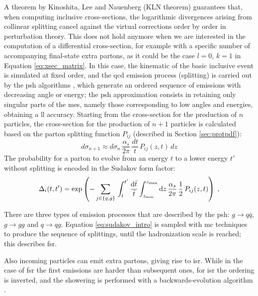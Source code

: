 A theorem by Kinoshita, Lee and Nauenberg (KLN theorem) \cite{Kinoshita:1962ur,Lee:1964is} guarantees that, 
when computing inclusive cross-sections, the logarithmic divergences arising from collinear splitting cancel against the virtual corrections order by order in perturbation theory. 
This does not hold anymore when we are interested in the computation of a differential cross-section, for example with a specific number of accompanying final-state extra partons, 
as it could be the case $l=0$, $k=1$ in Equation \ref{eq:xsec_matrix}. 
In this case, the kinematic of the basic inclusive event is simulated at fixed order, and the \gls{qcd} emission process (splitting) is carried out by the \gls{psh} algorithms \cite{Fox:1979ag}, which generate an ordered sequence of emissions with decreasing angle or energy; the \gls{psh} approximation consists in retaining only singular parts of the \glspl{me}, namely those corresponding to low angles and energies, obtaining a \gls{ll} accuracy.
Starting from the cross-section for the production of $n$ particles, the cross-section for the production 
of $n+1$ particles is calculated based on the parton splitting function $P_{ij}$ (described in Section \ref{sec:protpdf}):
\begin{equation}
d\sigma_{n+1} \approx d\sigma_n \, \frac{ \alpha_s }{2 \pi } \, \frac{dt}{t}  \,  P_{ij}(z, t) \, dz
\end{equation}
The probability for a parton to evolve from an energy $t$ to a lower energy $t'$ without splitting is encoded in the Sudakov form factor:
\begin{equation}
  \Delta_i(t,t')=\exp\left(-\sum_{j\in\{q,g\}}\,
  \int_t^{t'}\frac{{\rm{d}}\bar{t}}{\bar{t}}\int_{z_{\rm min}}^{z_{\rm max}}{\rm{d}} z\,
  \frac{ \alpha_s }{2 \pi } \, \frac{1}{2} \, P_{ij}(z, t) \right) \;,
  \label{eq:sudakov_intro}
\end{equation}

There are three types of emission processes that are described by the \gls{psh}: $g \rightarrow q\bar{q}$, $g \rightarrow gg$ and $q \rightarrow q g$.
Equation \ref{eq:sudakov_intro} is sampled with \gls{mc} techniques to produce the sequence of splittings, until the hadronization scale is reached;
this describes \gls{fsr}.

Also incoming particles can emit extra partons, giving rise to \gls{isr}. 
While in the case of \gls{fsr} the first emissions are harder than subsequent ones, 
for \gls{isr} the ordering is inverted, and the showering is performed with a backwards-evolution algorithm \cite{Sjostrand:1985xi}.

